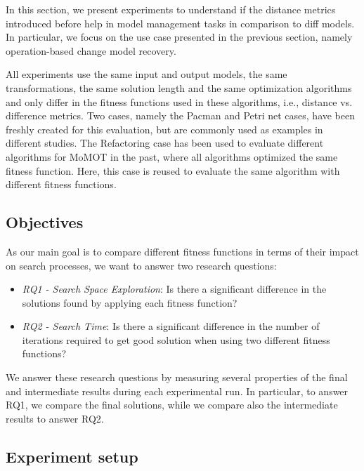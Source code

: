In this section, we present experiments to understand if the distance metrics introduced before help in model management tasks in comparison to diff models. In particular, we focus on the use case presented in the previous section, namely operation-based change model recovery. 

All experiments use the same input and output models, the same transformations, the same solution length and the
same optimization algorithms and only differ in the fitness functions used in these algorithms, i.e., distance vs. difference metrics. Two cases, namely the Pacman and Petri net cases, have been freshly created for this evaluation, but are commonly used as examples in different studies. The Refactoring case has been used to evaluate different algorithms for MoMOT in the past, where all algorithms optimized the same fitness function. Here, this case is reused to evaluate the same algorithm with different fitness functions.

\subsection{Objectives}

As our main goal is to compare different fitness functions in terms of their impact on search processes, we want to answer two research questions:

\begin{itemize}
	\item \textit{RQ1 - Search Space Exploration}: Is there a significant difference in the solutions found by applying each fitness function?
	\item \textit{RQ2 - Search Time}: Is there a significant difference in the number of iterations required to get good solution when using two different fitness functions?
\end{itemize}

We answer these research questions by measuring several properties of the final and intermediate results during each experimental run. In particular, to answer RQ1, we compare the final solutions, while we compare also the intermediate results to answer RQ2.

\subsection{Experiment setup}

